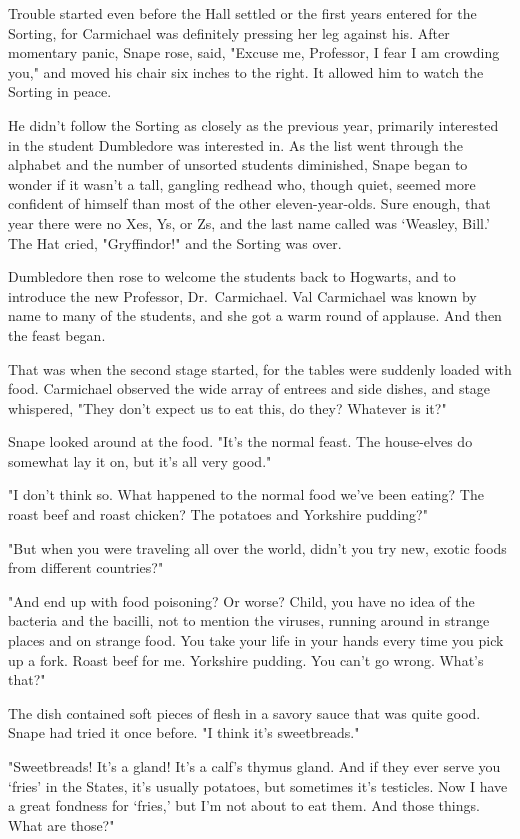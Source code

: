 Trouble started even before the Hall settled or the first years entered for the Sorting, for Carmichael was definitely pressing her leg against his. After momentary panic, Snape rose, said, "Excuse me, Professor, I fear I am crowding you," and moved his chair six inches to the right. It allowed him to watch the Sorting in peace.

He didn't follow the Sorting as closely as the previous year, primarily interested in the student Dumbledore was interested in. As the list went through the alphabet and the number of unsorted students diminished, Snape began to wonder if it wasn't a tall, gangling redhead who, though quiet, seemed more confident of himself than most of the other eleven-year-olds. Sure enough, that year there were no Xes, Ys, or Zs, and the last name called was `Weasley, Bill.' The Hat cried, "Gryffindor!" and the Sorting was over.

Dumbledore then rose to welcome the students back to Hogwarts, and to introduce the new Professor, Dr.~Carmichael. Val Carmichael was known by name to many of the students, and she got a warm round of applause. And then the feast began.

That was when the second stage started, for the tables were suddenly loaded with food. Carmichael observed the wide array of entrees and side dishes, and stage whispered, "They don't expect us to eat this, do they? Whatever is it?"

Snape looked around at the food. "It's the normal feast. The house-elves do somewhat lay it on, but it's all very good."

"I don't think so. What happened to the normal food we've been eating? The roast beef and roast chicken? The potatoes and Yorkshire pudding?"

"But when you were traveling all over the world, didn't you try new, exotic foods from different countries?"

"And end up with food poisoning? Or worse? Child, you have no idea of the bacteria and the bacilli, not to mention the viruses, running around in strange places and on strange food. You take your life in your hands every time you pick up a fork. Roast beef for me. Yorkshire pudding. You can't go wrong. What's that?"

The dish contained soft pieces of flesh in a savory sauce that was quite good. Snape had tried it once before. "I think it's sweetbreads."

"Sweetbreads! It's a gland! It's a calf's thymus gland. And if they ever serve you `fries' in the States, it's usually potatoes, but sometimes it's testicles. Now I have a great fondness for `fries,' but I'm not about to eat them. And those things. What are those?"

